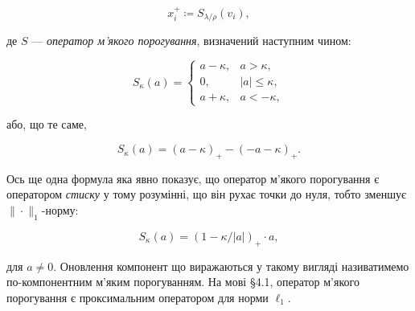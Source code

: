 \begin{equation}
    x_i^+ \coloneqq S_{\lambda/\rho}(v_i), 
\end{equation}

де $S$ --- \textit{оператор м'якого порогування}, визначений наступним чином:

\begin{equation}
    S_\kappa(a) = \begin{cases} 
        a - \kappa, & a > \kappa, \\ 
        0, & |a| \le \kappa, \\ 
        a + \kappa, & a < - \kappa, 
    \end{cases}
\end{equation}

або, що те саме,

\begin{equation}
    S_\kappa(a) = (a - \kappa)_+ - (- a - \kappa)_+.
\end{equation}

Ось ще одна формула яка явно показує, що оператор м'якого порогування є оператором \textit{стиску} у тому розумінні, що він рухає точки до нуля, тобто зменшує $\|\cdot\|_1$-норму:

\begin{equation}
    S_\kappa(a) = (1 - \kappa/|a|)_+ \cdot a,
\end{equation}

для $a \ne 0$. Оновлення компонент що  виражаються у такому вигляді називатимемо по-компонентним м'яким порогуванням. На мові \S4.1, оператор м'якого порогування є проксимальним оператором для норми $\ell_1$.
